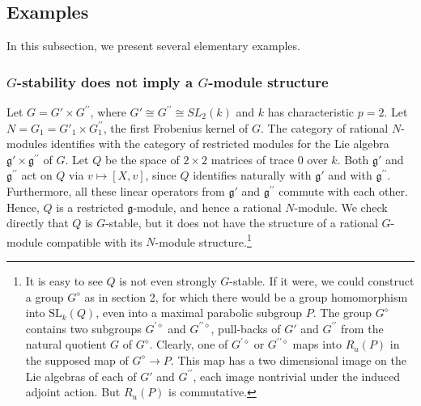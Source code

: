 \documentclass[11pt,leqno,amscd,amssymb,verbatim, url]{amsart}
\theoremstyle{definition}
\numberwithin{equation}{thm}
\begin{document}
\subsection{Examples} In this subsection, we present several elementary examples.

\subsubsection{$G$-stability does not imply a $G$-module structure}Let $G=G'\times G^{\prime\prime}$, where $G'\cong G^{\prime\prime}\cong SL_2(k)$ and $k$ has characteristic $p=2$. Let $N=G_1=G'_1\times G_1^{\prime\prime}$, the first Frobenius kernel of $G$. The
category of rational $N$-modules identifies with the category of restricted modules for the Lie algebra ${\mathfrak g}'
\times{\mathfrak g}^{\prime\prime}$ of $G$. Let
$Q$ be the space of $2\times 2$ matrices of trace 0 over $k$. Both ${\mathfrak g}'$ and ${\mathfrak g}^{\prime\prime}$ act
on $Q$ via $v\mapsto [X,v]$, since $Q$ identifies naturally with ${\mathfrak g}'$ and with ${\mathfrak g}^{\prime\prime}$.
Furthermore, all these linear operators from ${\mathfrak g}'$ and ${\mathfrak g}^{\prime\prime}$ commute with each other. Hence, $Q$ is a restricted $\mathfrak g$-module, and hence a rational $N$-module. We check directly that $Q$ is $G$-stable, but it does not have the structure of a rational $G$-module compatible with its
$N$-module structure.\footnote{It is easy to see $Q$ is not even strongly $G$-stable. If it were,
   we could construct a group $G^\diamond$ as in section 2, for
   which there would be a group homomorphism into $\text{SL}_k(Q)$, even
   into a maximal parabolic subgroup $P$. The group $G^\diamond$ contains two subgroups $G^{\prime\diamond}$ and $G^{\prime\prime\diamond}$,
pull-backs of $G'$ and $G^{\prime\prime}$ from the natural quotient $G$ of $G^\diamond$. Clearly,
 one of $G^{\prime\diamond}$ or $G^{\prime\prime\diamond}$ maps into $R_u(P)$ in the supposed map of $G^\diamond\to P$. This map has a two dimensional
image on the Lie algebras of each of $G'$ and $G^{\prime\prime}$, each image nontrivial
under the induced adjoint action. But $R_u(P)$ is commutative.}
\end{document}
